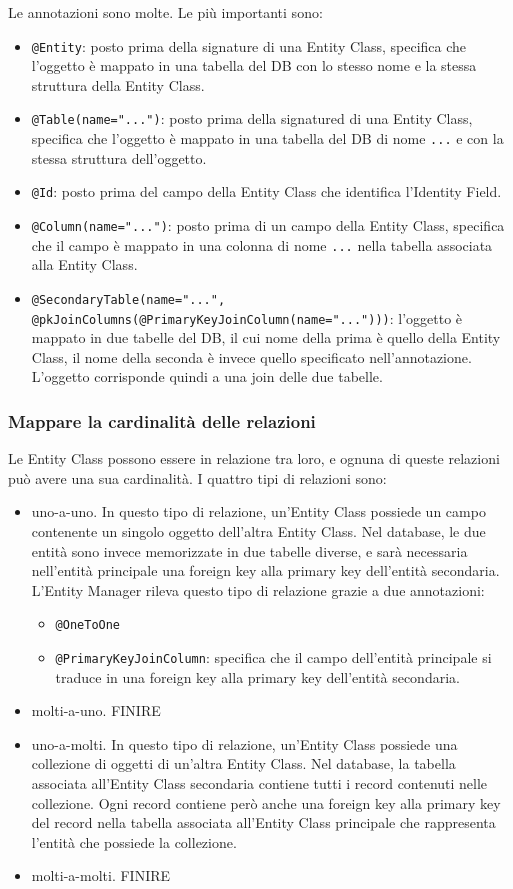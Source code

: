 Le annotazioni sono molte. Le più importanti sono:
\begin{itemize}
    \item \verb|@Entity|: posto prima della signature di una Entity Class, specifica che l'oggetto è mappato in una tabella del DB con lo stesso nome e la stessa struttura della Entity Class.
    \item \verb|@Table(name="...")|: posto prima della signatured di una Entity Class, specifica che l'oggetto è mappato in una tabella del DB di nome \verb|...| e con la stessa struttura dell'oggetto.
    \item \verb|@Id|: posto prima del campo della Entity Class che identifica l'Identity Field.
    \item \verb|@Column(name="...")|: posto prima di un campo della Entity Class, specifica che il campo è mappato in una colonna di nome \verb|...| nella tabella associata alla Entity Class.
    \item \verb|@SecondaryTable(name="...", @pkJoinColumns(@PrimaryKeyJoinColumn(name="...")))|: l'oggetto è mappato in due tabelle del DB, il cui nome della prima è quello della Entity Class, il nome della seconda è invece quello specificato nell'annotazione. L'oggetto corrisponde quindi a una join delle due tabelle.
\end{itemize}

\subsubsection{Mappare la cardinalità delle relazioni}
Le Entity Class possono essere in relazione tra loro, e ognuna di queste relazioni può avere una sua cardinalità.
I quattro tipi di relazioni sono:
\begin{itemize}
    \item uno-a-uno. In questo tipo di relazione, un'Entity Class possiede un campo contenente un singolo oggetto dell'altra Entity Class.
    Nel database, le due entità sono invece memorizzate in due tabelle diverse, e sarà necessaria nell'entità principale una foreign key alla primary key dell'entità secondaria.\\
    L'Entity Manager rileva questo tipo di relazione grazie a due annotazioni:
    \begin{itemize}
        \item \verb|@OneToOne|
        \item \verb|@PrimaryKeyJoinColumn|: specifica che il campo dell'entità principale si traduce in una foreign key alla primary key dell'entità secondaria.
    \end{itemize}
    \item molti-a-uno. FINIRE
    \item uno-a-molti. In questo tipo di relazione, un'Entity Class possiede una collezione di oggetti di un'altra Entity Class.
    Nel database, la tabella associata all'Entity Class secondaria contiene tutti i record contenuti nelle collezione. Ogni record contiene però anche una foreign key alla primary key del record nella tabella associata all'Entity Class principale che rappresenta l'entità che possiede la collezione.
    \item molti-a-molti. FINIRE
\end{itemize}